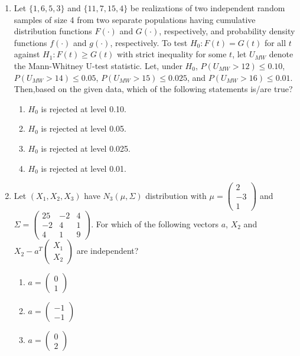 \documentclass[journal,12pt,onecolumn]{IEEEtran}
\theoremstyle{remark}
\begin{document}
\begin{enumerate}
    \item Let $\{1, 6, 5, 3\}$ and $\{11, 7, 15, 4\}$ be realizations of two independent random samples of size 4 from two separate populations having cumulative distribution functions $F(\cdot)$ and $G(\cdot)$, respectively, and probability density functions $f(\cdot)$ and $g(\cdot)$, respectively. To test $H_0: F(t) = G(t)$ for all $t$ against $H_1: F(t) \geq G(t)$ with strict inequality for some $t$, let $U_{MW}$ denote the Mann-Whitney U-test statistic. Let, under $H_0$, $P(U_{MW} > 12) \leq 0.10$, $P(U_{MW} > 14) \leq 0.05$, $P(U_{MW} > 15) \leq 0.025$, and $P(U_{MW} > 16) \leq 0.01$. Then,based on the given data, which of the following statements is/are true?
    \begin{enumerate}
        \item $H_0$ is rejected at level 0.10.
        \item $H_0$ is rejected at level 0.05.
        \item $H_0$ is rejected at level 0.025.
        \item $H_0$ is rejected at level 0.01.
    \end{enumerate}
    \item Let $(X_1, X_2, X_3)$ have $N_3(\mu, \Sigma)$ distribution with $\mu = \begin{pmatrix} 2 \\ -3 \\ 1 \end{pmatrix}$ and $\Sigma = \begin{pmatrix} 25 & -2 & 4 \\ -2 & 4 & 1 \\ 4 & 1 & 9 \end{pmatrix}$. For which of the following vectors $a$, $X_2$ and $X_2 - a^T \begin{pmatrix} X_1 \\ X_2 \end{pmatrix}$ are independent?
    \begin{enumerate}
        \item $a = \begin{pmatrix}  0 \\ 1 \end{pmatrix}$
        \item $a = \begin{pmatrix}  -1 \\ -1 \end{pmatrix}$
        \item $a = \begin{pmatrix}  0 \\ 2 \end{pmatrix}$

\end{enumerate}
\end{enumerate}
\end{document}
